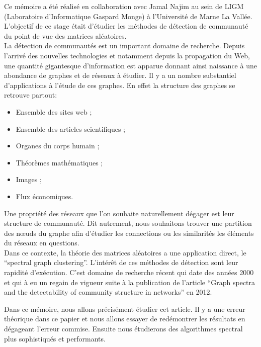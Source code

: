 Ce mémoire a été réalisé en collaboration avec Jamal Najim au sein de LIGM (Laboratoire d'Informatique Gaspard Monge) à l'Université de Marne La Vallée.
L'objectif de ce stage était d'étudier les méthodes de détection de communauté du point de vue des matrices aléatoires.\\

La détection de communautés est un important domaine de recherche. 
Depuis l'arrivé des nouvelles technologies et notamment depuis la propagation du Web, une quantité gigantesque d'information est apparue donnant ainsi naissance à une abondance de graphes et de réseaux à étudier.
Il y a un nombre substantiel d'applications à l'étude de ces graphes.
En effet la structure des graphes se retrouve partout: 
\begin{itemize}
	\item Ensemble des sites web ;
	\item Ensemble des articles scientifiques ;
	\item Organes du corps humain ;
	\item Théorèmes mathématiques ;
	\item Images ;
	\item Flux économiques.
\end{itemize}
Une propriété des réseaux que l'on souhaite naturellement dégager est leur structure de communauté.
Dit autrement, nous souhaitons trouver une partition des nœuds du graphe afin d'étudier les connections ou les similarités les éléments du réseaux en questions.\\

Dans ce contexte, la théorie des matrices aléatoires a une application direct, le ``spectral graph clustering''.
L'intérêt de ces méthodes de détection sont leur rapidité d’exécution.
C'est domaine de recherche récent qui date des années 2000 et qui à eu un regain de vigueur suite à la publication de l'article ``Graph spectra and the detectability of community structure in networks'' \cite{raj_rao} en 2012.

Dans ce mémoire, nous allons précisément étudier cet article.
Il y a une erreur théorique dans ce papier et nous allons essayer de redémontrer les résultats en dégageant l'erreur commise.
Ensuite nous étudierons des algorithmes spectral plus sophistiqués et performants.\\
